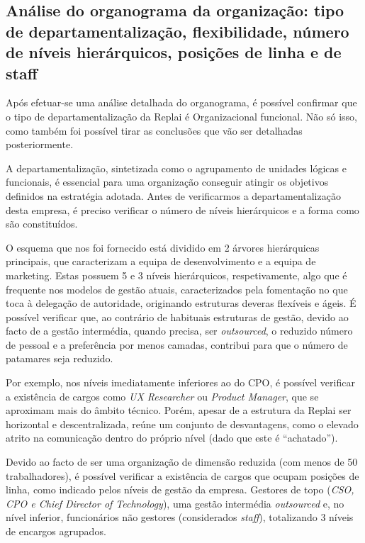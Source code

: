\subsection{Análise do organograma da organização: tipo de departamentalização, flexibilidade, número de níveis hierárquicos, posições de linha e de staff}

Após efetuar-se uma análise detalhada do organograma, é possível confirmar que o tipo de departamentalização da Replai é Organizacional funcional. Não só isso, como também foi possível tirar as conclusões que vão ser detalhadas posteriormente.
  
A departamentalização, sintetizada como o agrupamento de unidades lógicas e funcionais, é essencial para uma organização conseguir atingir os objetivos definidos na estratégia adotada. Antes de verificarmos a departamentalização desta empresa, é preciso verificar o número de níveis hierárquicos e a forma como são constituídos.
  
O esquema que nos foi fornecido está dividido em 2 árvores hierárquicas principais, que caracterizam a equipa de desenvolvimento e a equipa de marketing. Estas possuem 5 e 3 níveis hierárquicos, respetivamente, algo que é frequente nos modelos de gestão atuais, caracterizados pela fomentação no que toca à delegação de autoridade, originando estruturas deveras flexíveis e ágeis. É possível verificar que, ao contrário de habituais estruturas de gestão, devido ao facto de a gestão intermédia, quando precisa, ser \textit{outsourced}, o reduzido número de pessoal e a preferência por menos camadas, contribui para que o número de patamares seja reduzido.
  
Por exemplo, nos níveis imediatamente inferiores ao do CPO, é possível verificar a existência de cargos como \textit{UX Researcher} ou \textit{Product Manager}, que se aproximam mais do âmbito técnico. Porém, apesar de a estrutura da Replai ser horizontal e descentralizada, reúne um conjunto de desvantagens, como o elevado atrito na comunicação dentro do próprio nível (dado que este é “achatado”).
 
Devido ao facto de ser uma organização de dimensão reduzida (com menos de 50 trabalhadores), é possível verificar a existência de cargos que ocupam posições de linha, como indicado pelos níveis de gestão da empresa. Gestores de topo (\textit{CSO, CPO e Chief Director of Technology}), uma gestão intermédia \textit{outsourced} e, no nível inferior, funcionários não gestores (considerados \textit{staff}), totalizando 3 níveis de encargos agrupados. 
  
